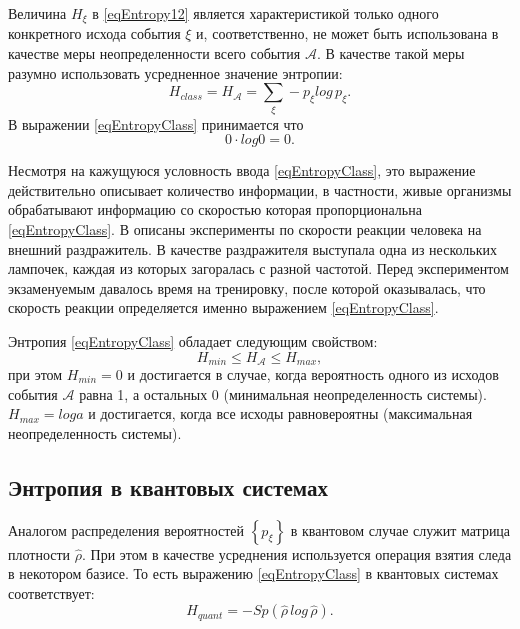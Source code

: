 Величина $H_{\xi}$ в \eqref{eqEntropy12} является характеристикой
только одного конкретного исхода события $\xi$ и, соответственно, не
может быть использована в качестве меры неопределенности всего события
$\mathcal{A}$. В качестве такой меры разумно использовать усредненное
значение энтропии:
\begin{equation}
H_{class} = H_{\mathcal{A}} = \sum_{\xi} - p_{\xi} log \, p_{\xi}.
\label{eqEntropyClass}
\end{equation}
В выражении \eqref{eqEntropyClass} принимается что
\begin{equation}
0 \cdot log 0 = 0.
\label{eqEntropyClassAdd}
\end{equation}

Несмотря на кажущуюся условность ввода \eqref{eqEntropyClass}, это
выражение действительно описывает количество информации, в частности,
живые организмы обрабатывают информацию со скоростью которая
пропорциональна \eqref{eqEntropyClass}. В \cite{bYaglom} 
описаны эксперименты по скорости реакции человека
на внешний раздражитель. В качестве раздражителя выступала одна из нескольких
лампочек, каждая из которых загоралась с разной частотой. Перед
экспериментом экзаменуемым давалось время на тренировку, после которой оказывалась,
что скорость реакции определяется именно выражением \eqref{eqEntropyClass}.

Энтропия \eqref{eqEntropyClass} обладает следующим свойством:
\begin{equation}
H_{min} \le H_{\mathcal{A}} \le H_{max},
\label{eqEntropyClassProperty}
\end{equation}
при этом $H_{min} = 0$ и достигается в случае, когда вероятность одного
из исходов события $\mathcal{A}$ равна 1, а остальных 0 (минимальная
неопределенность системы). $H_{max} = log a$ и достигается, когда все
исходы равновероятны (максимальная неопределенность системы).

\subsection{Энтропия в квантовых системах}

Аналогом распределения вероятностей $\left\{p_{\xi}\right\}$ в
квантовом случае служит матрица плотности $\hat{\rho}$. При этом в
качестве усреднения используется операция взятия следа в некотором
базисе. То есть выражению \eqref{eqEntropyClass} в квантовых системах
соответствует:
\begin{equation}
H_{quant} = - Sp \left(\hat{\rho} \, log \, \hat{\rho}\right).
\label{eqEntropyQuant}
\end{equation}

